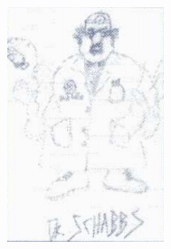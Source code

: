 \documentclass[book.tex]{subfiles}
\begin{document}
     \begin{minipage}{.48\textwidth}
     \includegraphics[width=\textwidth]{imgs/tom_hall_sketch_dr_schabbs.png}
  \end{minipage}
\end{document}
